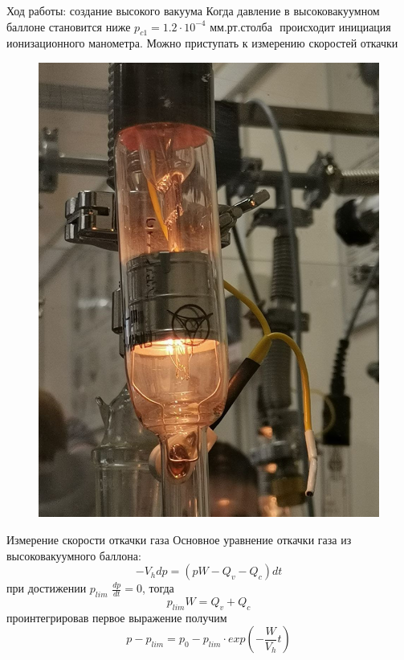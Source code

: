\documentclass[xcolor=table]{beamer}
\begin{document}
\begin{frame}{Ход работы: создание высокого вакуума}
    Когда давление в высоковакуумном баллоне становится ниже \(p_{c1}=1.2 \cdot 10^{-4} \text{ мм.рт.столба }\)
    происходит инициация ионизационного манометра. Можно приступать к измерению скоростей откачки
    \begin{figure}[h]
        \centering
        \includegraphics[scale = 0.12]{images/ion.jpg}
    \end{figure}
\end{frame}
\begin{frame}{Измерение скорости откачки газа}
   Основное уравнение откачки газа из высоковакуумного баллона:
   \[-V_hdp = (pW - Q_v - Q_c)dt\]
   при достижении \(p_{lim}\) \(\frac{dp}{dt} = 0\), тогда
   \[p_{lim}W = Q_v + Q_c\]
   проинтегрировав первое выражение получим
   \[p-p_{lim} = p_0-p_{lim}\cdot exp(-\frac{W}{V_h}t)\]
\end{frame}
\end{document}
